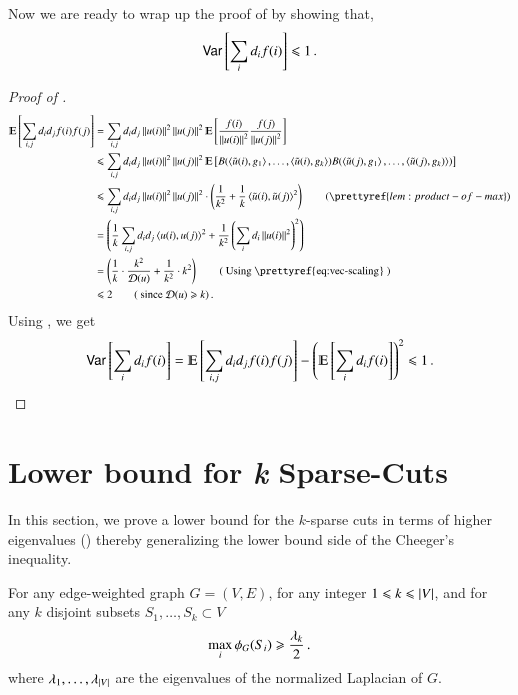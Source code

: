 \documentclass[11pt]{article}
\newcommand{\trudim}{\cD}
\begin{document}
\noindent Now we are ready to wrap up the proof of  by
showing that,
%
\[ \operatorname*{{\sf Var}} \left[\sum_i d_i f(i)\right] \leqslant 1 \,. \]
%
\begin{proof}[Proof of ]
\begin{align*}
\Ex{ \sum_{i,j} d_i d_j f(i) f(j) } & = \sum_{i,j} d_i d_j \norm{u(i)}^2 \norm{u(j)}^2 \Ex{\frac{f(i)}{\norm{u(i)}^2}
\frac{f(j)}{\norm{u(j)}^2}} \\
& \leq \sum_{i,j} d_i d_j \norm{u(i)}^2 \norm{u(j)}^2
\Ex{B(\inprod{\tilde{u}(i),g_1},\ldots,\inprod{\tilde{u}(i),g_k})B(\inprod{\tilde{u}(j),g_1},\ldots,\inprod{\tilde{u}(j),g_k)})} \\
& \leq \sum_{i,j} d_i d_j \norm{u(i)}^2 \norm{u(j)}^2 \cdot
\paren{\frac{1}{k^2} + \frac{1}{k} \inprod{\tilde{u}(i),\tilde{u}(j)}^2 }
\qquad ( \prettyref{lem:product-of-max}) \\
& = \paren{ \frac{1}{k} \sum_{i,j} d_i d_j \inprod{u(i),u(j)}^2 + \frac{1}{k^2} \paren{\sum_i d_i \norm{u(i)}^2}^2 } \\
& = \paren{ \frac{1}{k} \cdot \frac{k^2}{\trudim(u)}  + \frac{1}{k^2} \cdot k^2 } 
		\qquad \textrm{( Using \prettyref{eq:vec-scaling}  )} \\
& \leq 2 \qquad \textrm{( since  }  \trudim(u)\geq k \textrm{)} \mper
\end{align*}
Using , we get
\[ \var{\sum_i d_i f(i) } =  \Ex{ \sum_{i,j} d_i d_j f(i) f(j) } - \left(\Ex{\sum_i d_i f(i)  }\right)^2
\leq 1 \mper \]

\end{proof}





\section{Lower bound for {\em k} Sparse-Cuts}
\label{sec:lower}
In this section, we prove a lower bound for the $k$-sparse cuts in
terms of higher eigenvalues () thereby
generalizing the lower bound side of the Cheeger's inequality.
\begin{proposition}
For any edge-weighted graph $G=(V,E)$, for any integer $1 \leqslant k \leqslant
\left\lvert V\right\rvert$, and for any $k$ disjoint subsets $S_1, \ldots, S_k \subset V$
\[ \max_i \phi_G(S_i) \geqslant  \frac{\lambda_{k}}{2}  \,. \]
where $\lambda_1, \ldots, \lambda_{\left\lvert V\right\rvert}$ are the eigenvalues of the
normalized Laplacian of $G$.
\end{proposition}
\end{document}
